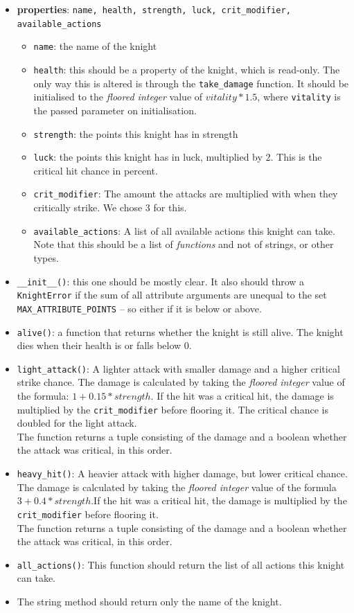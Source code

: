 \begin{itemize}
	\item \textbf{properties}: \texttt{name, health, strength, luck, crit\_modifier, available\_actions}
		\begin{itemize}
			\item \texttt{name}: the name of the knight
			\item \texttt{health}: this should be a property of the knight, which is read-only.
				The only way this is altered is through the \texttt{take\_damage}
				function. It should be initialised to the \textit{floored integer} value of
				$vitality * 1.5$, where \texttt{vitality} is the passed parameter on initialisation.
			\item \texttt{strength}: the points this knight has in strength
			\item \texttt{luck}: the points this knight has in luck, multiplied by 2.
				This is the critical hit chance in percent.
			\item \texttt{crit\_modifier}: The amount the attacks are multiplied with when they
				critically strike. We chose 3 for this.
			\item \texttt{available\_actions}: A list of all available actions this knight can take.
				Note that this should be a list of \textit{functions} and not of strings, or other
				types.
		\end{itemize}
	\item \texttt{\_\_init\_\_()}: this one should be mostly clear. It also should
		throw a \texttt{KnightError} if the sum of all attribute arguments are
		unequal to the set \texttt{MAX\_ATTRIBUTE\_POINTS} -- so either if it is
		below or above.
	\item \texttt{alive()}: a function that returns whether the knight is 
		still alive. The knight dies when their health is or falls below 0.
	\item \texttt{light\_attack()}: A lighter attack with smaller damage and a higher
		critical strike chance. The damage is calculated by taking the \textit{floored integer}
		value of the formula: $1 + 0.15 * strength$. If the hit was a critical hit, the 
		damage is multiplied by the \texttt{crit\_modifier} before flooring it. The critical
		chance is doubled for the light attack.\\
		The function returns a tuple consisting of the damage and a boolean whether the attack
		was critical, in this order.
	\item \texttt{heavy\_hit()}: A heavier attack with higher damage, but lower critical chance.
		The damage is calculated by taking the \textit{floored integer} value of the formula
		$3 + 0.4 * strength$.If the hit was a critical hit, the damage is multiplied by
		the \texttt{crit\_modifier} before flooring it.\\
		The function returns a tuple consisting of the damage and a boolean whether the attack
		was critical, in this order.
	\item \texttt{all\_actions()}: This function should return the list of all actions this knight
		can take.
	\item The string method should return only the name of the knight.
\end{itemize}


